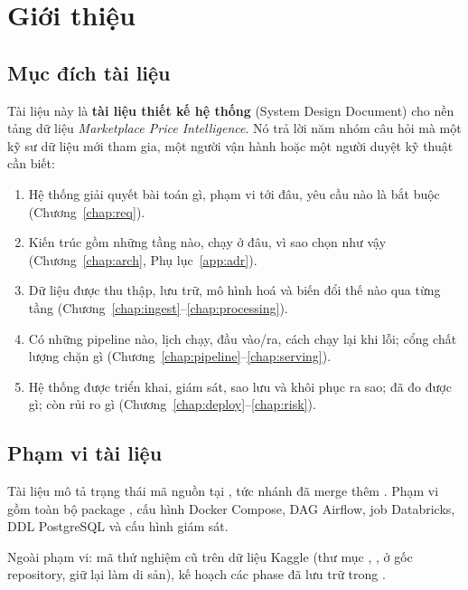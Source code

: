 \chapter{Giới thiệu}\label{chap:intro}

\section{Mục đích tài liệu}
Tài liệu này là \textbf{tài liệu thiết kế hệ thống} (System Design Document) cho nền tảng dữ liệu
\emph{Marketplace Price Intelligence}. Nó trả lời năm nhóm câu hỏi mà một kỹ sư dữ liệu mới tham gia,
một người vận hành hoặc một người duyệt kỹ thuật cần biết:

\begin{enumerate}
  \item Hệ thống giải quyết bài toán gì, phạm vi tới đâu, yêu cầu nào là bắt buộc (Chương~\ref{chap:req}).
  \item Kiến trúc gồm những tầng nào, chạy ở đâu, vì sao chọn như vậy (Chương~\ref{chap:arch}, Phụ lục~\ref{app:adr}).
  \item Dữ liệu được thu thập, lưu trữ, mô hình hoá và biến đổi thế nào qua từng tầng (Chương~\ref{chap:ingest}--\ref{chap:processing}).
  \item Có những pipeline nào, lịch chạy, đầu vào/ra, cách chạy lại khi lỗi; cổng chất lượng chặn gì (Chương~\ref{chap:pipeline}--\ref{chap:serving}).
  \item Hệ thống được triển khai, giám sát, sao lưu và khôi phục ra sao; đã đo được gì; còn rủi ro gì (Chương~\ref{chap:deploy}--\ref{chap:risk}).
\end{enumerate}

\section{Phạm vi tài liệu}
Tài liệu mô tả trạng thái mã nguồn tại \DocBaseline, tức nhánh 
đã merge thêm . Phạm vi gồm toàn bộ package , cấu hình Docker Compose,
DAG Airflow, job Databricks, DDL PostgreSQL và cấu hình giám sát.

Ngoài phạm vi: mã thử nghiệm cũ trên dữ liệu Kaggle (thư mục , ,
 ở gốc repository, giữ lại làm di sản), kế hoạch các phase đã lưu trữ trong .

